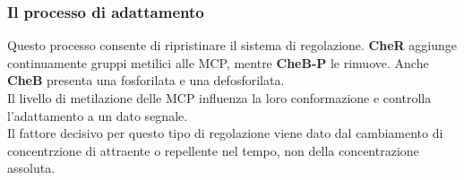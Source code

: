 \subsubsection{Il processo di adattamento}
Questo processo consente di ripristinare il sistema di regolazione. \textbf{CheR} aggiunge continuamente gruppi metilici alle MCP, mentre \textbf{CheB-P} le rimuove. Anche \textbf{CheB} presenta una fosforilata e una defosforilata. \\Il livello di metilazione delle MCP influenza la loro conformazione e controlla l'adattamento a un dato segnale. 
\\Il fattore decisivo per questo tipo di regolazione viene dato dal cambiamento di concentrzione di attraente o repellente nel tempo, non della concentrazione assoluta. 
